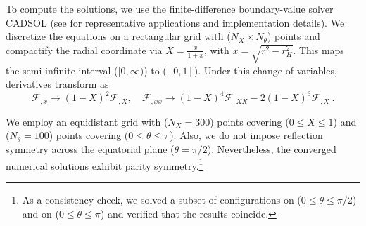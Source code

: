 \documentclass[11pt]{article}
\numberwithin{equation}{section} %
\begin{document}
\medskip


To compute the solutions, we use the finite-difference boundary-value solver CADSOL \cite{SCHONAUER1989279,SCHONAUER1990279,SCHONAUER2001473} (see \cite{Delgado:2022pwo,Herdeiro:2025blx,Herdeiro:2024pmv} for representative applications and implementation details). We discretize the equations on a rectangular grid with ($N_X\times N_\theta$) points and compactify the radial coordinate via $X=\frac{x}{1+x}$, with $x=\sqrt{r^{2}-r_H^{2}}$. This maps the semi-infinite interval ($[0,\infty)$) to ($[0,1]$). Under this change of variables, derivatives transform as
	\begin{equation}
		\mathcal{F}_{, x} \longrightarrow (1-  X)^2 \mathcal{F}_{, X}, \quad \mathcal{F}_{, x x} \longrightarrow (1-X)^4 \mathcal{F}_{, XX}-2(1-X)^3 \mathcal{F}_{, X} \ .
	\end{equation}

We employ an equidistant grid with ($N_X=300$) points covering ($0\le X\le 1$) and ($N_\theta=100$) points covering ($0\le \theta\le \pi$). Also, we do not impose reflection symmetry across the equatorial plane ($\theta=\pi/2$). Nevertheless, the converged numerical solutions exhibit parity symmetry.\footnote{As a consistency check, we solved a subset of configurations on ($0\le\theta\le\pi/2$) and on ($0\le\theta\le\pi$) and verified that the results coincide.}




	  
	

	
\end{document}
